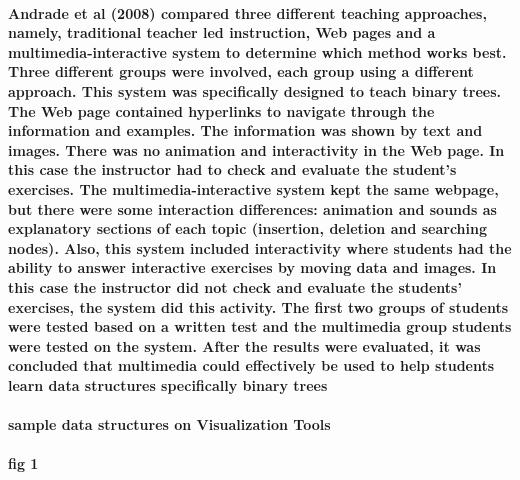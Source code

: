 \documentclass{article}
\begin{document}
\paragraph{\cite{ladegaardconference}Andrade et al (2008) compared three different teaching approaches, namely, traditional teacher led instruction, Web pages and a multimedia-interactive system to determine which method works best. Three different groups were involved, each group using a different approach. This system was specifically designed to teach binary trees. The Web page contained hyperlinks to navigate through the information and examples. The information was shown by text and images. There was no animation and interactivity in the Web page. In this case the instructor had to check and evaluate the student's exercises. The multimedia-interactive system kept the same webpage, but there were some interaction differences: animation and sounds as explanatory sections of each topic (insertion, deletion and searching nodes). Also, this system included interactivity where students had the ability to answer interactive exercises by moving data and images. In this case the instructor did not check and evaluate the students' exercises, the system did this activity. The first two groups of students were tested based on a written test and the multimedia group students were tested on the system. After the results were evaluated, it was concluded that multimedia could effectively be used to help students learn data structures specifically binary trees}
\paragraph{sample data structures on Visualization Tools}
\paragraph{fig 1}
\end{document}
